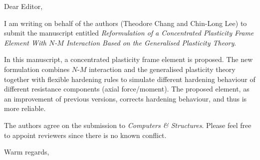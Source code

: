 \documentclass[a4paper,11pt]{letter}
\begin{document}
\onehalfspacing
\begin{letter}{}
\address{1.127, IRIS Adlershof\\Humboldt-Universität zu Berlin\\Berlin, Germany, 12489}

\opening{Dear Editor,}

I am writing on behalf of the authors (Theodore Chang and Chin-Long Lee) to submit the manuscript entitled \textit{Reformulation of a Concentrated Plasticity Frame Element With $N$-$M$ Interaction Based on the Generalised Plasticity Theory}.

In this manuscript, a concentrated plasticity frame element is proposed. The new formulation combines $N$-$M$ interaction and the generalised plasticity theory together with flexible hardening rules to simulate different hardening behaviour of different resistance components (axial force/moment). The proposed element, as an improvement of previous versions, corrects hardening behaviour, and thus is more reliable.

The authors agree on the submission to \textit{Computers \& Structures}. Please feel free to appoint reviewers since there is no known conflict.

\signature{Theodore Chang}

\closing{Warm regards,}
\end{letter}
\clearpage
\end{document}
